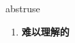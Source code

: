 
\begin{frame}
{\huge abstruse}
\begin{center}
\begin{enumerate}\Large
  \item \textbf{难以理解的}
\end{enumerate}
\end{center}
\end{frame}
